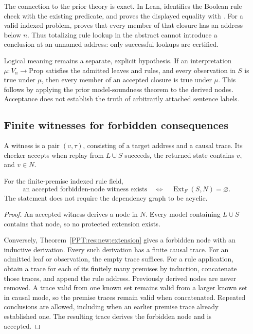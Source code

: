 The connection to the prior theory is exact. In Lean,  identifies the Boolean rule check with the existing  predicate, and  proves the displayed equality with . For a valid indexed problem,  proves that every member of that closure has an address below $n$. Thus totalizing rule lookup in the abstract  cannot introduce a conclusion at an unnamed address: only successful lookups are certified.

Logical meaning remains a separate, explicit hypothesis. If an interpretation $\mu:V_n\to\mathrm{Prop}$ satisfies the admitted leaves and rules, and every observation in $S$ is true under $\mu$, then every member of an accepted closure is true under $\mu$. This follows by applying the prior model-soundness theorem to the derived nodes. Acceptance does not establish the truth of arbitrarily attached sentence labels.

\subsection{Finite witnesses for forbidden consequences}
\label{PPT:sec:trace-obstruction}

\begin{PPTdefinition}
\label{PPT:res:trace:witness}
A witness is a pair $(v,\tau)$, consisting of a target address and a causal trace. Its checker accepts when replay from $L\cup S$ succeeds, the returned state contains $v$, and $v\in N$.
\end{PPTdefinition}

\begin{PPTtheorem}
\label{PPT:res:trace:complete}
For the finite-premise indexed rule field,
\[
 \boxed{
 \text{an accepted forbidden-node witness exists}
 \quad\Longleftrightarrow\quad
 \operatorname{Ext}_F(S,N)=\varnothing.
 }
\]
The statement does not require the dependency graph to be acyclic.
\end{PPTtheorem}
\begin{proof}
An accepted witness derives a node in $N$. Every model containing $L\cup S$ contains that node, so no protected extension exists.

Conversely, Theorem~\ref{PPT:res:new:extension} gives a forbidden node with an inductive derivation. Every such derivation has a finite causal trace. For an admitted leaf or observation, the empty trace suffices. For a rule application, obtain a trace for each of its finitely many premises by induction, concatenate those traces, and append the rule address. Previously derived nodes are never removed. A trace valid from one known set remains valid from a larger known set in causal mode, so the premise traces remain valid when concatenated. Repeated conclusions are allowed, including when an earlier premise trace already established one. The resulting trace derives the forbidden node and is accepted.
\end{proof}

